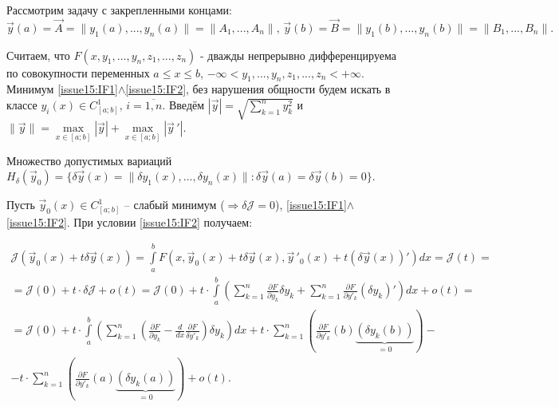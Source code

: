     Рассмотрим задачу с закрепленными концами: 
    \begin{equation} \label{issue15:IF2}
    	\vec{y}(a) = \vec{A} = \| y_1(a), ..., y_n(a)\| = \| A_1, ..., A_n\|,\, \vec{y}(b) = \vec{B} = \| y_1(b), ..., y_n(b)\| = \| B_1, ..., B_n \|.
    \end{equation}
    
    Считаем, что $F(x, y_1, ..., y_n, z_1, ..., z_n)$ - дважды непрерывно дифференцируема по совокупности переменных $a \leqslant x \leqslant b$, $-\infty < y_1, ..., y_n, z_1, ..., z_n < +\infty$. 
    Минимум \eqref{issue15:IF1}$\wedge$\eqref{issue15:IF2}, без нарушения общности будем искать в классе $y_i(x) \in C^1_{[a;b]}, \, i = \overline{1, n}$. 
    Введём $|\vec{y}| = \sqrt{\sum \limits_{k=1}^{n} y^2_k}$ и $\|\vec{y}\| = \max \limits_{x \in [a;b]} |\vec{y}| + \max \limits_{x \in [a;b]} | \vec{y}\,' |$. 
    
    Множество допустимых вариаций $H_{\delta}(\vec{y}_0) = \{\delta \vec{y}(x) = \| \delta y_1 (x), ..., \delta y_n(x)\|: \delta \vec{y}(a) = \delta \vec{y}(b) = 0 \}.$
    
    Пусть $\vec{y}_0(x) \in C^1_{[a;b]}$ -- слабый минимум ($\Rightarrow \delta \mathcal{J} = 0$), \eqref{issue15:IF1}$\wedge$\eqref{issue15:IF2}. При условии \eqref{issue15:IF2} получаем:
    
    \begin{multline*}
            \mathcal{J}(\vec{y}_0(x) + t \delta \vec{y}(x)) = \int \limits_a^b F(x, \vec{y}_0(x) + t\delta \vec{y}(x), \vec{y}\,'_0(x) + t(\delta \vec{y}(x))')dx = \mathcal{J}(t) = \\ 
            = \mathcal{J}(0) + t \cdot \delta\mathcal{J} + o(t) = \mathcal{J}(0) + t \cdot \int \limits_a^b \left( \sum \limits_{k =1}^n \frac{\partial F}{\partial y_k} \delta y_k + \sum \limits_{k=1}^n \frac{\partial F}{\partial y'_k} (\delta y_k)' \right) dx + o(t) = \\ 
            = \mathcal{J}(0) + t \cdot \int \limits_a^b \left( \sum \limits_{k = 1}^n \left( \frac{\partial F}{\partial y_k} - \frac{d}{dx} \frac{\partial F}{\delta y'_k}  \right) \delta y_k \right) dx
            + t \cdot \sum \limits_{k = 1}^n \left( \frac{\partial F}{\partial y'_k}(b) \underbrace{(\delta y_k (b))}_{= 0} \right) - \\ 
            - t \cdot \sum \limits_{k = 1}^n \left( \frac{\partial F}{\partial y'_k}(a) \underbrace{(\delta y_k (a))}_{= 0} \right) + o(t).
    \end{multline*}

